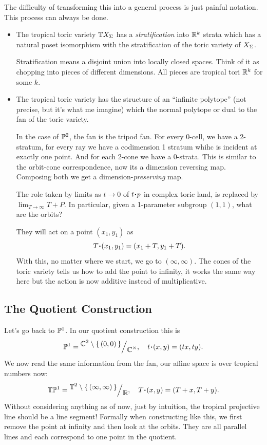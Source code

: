 \documentclass[12pt]{memoir}
\theoremstyle{definition}
\begin{document}
The difficulty of transforming this into a general process is just painful notation. This process can always be done.

\begin{itemize}
    \item The tropical toric variety $\mathbb{T} X_\Sigma$ has a \emph{stratification} into $\mathbb{R}^k$ strata which has a natural poset isomorphism with the stratification of the toric variety of $X_\Sigma$.\par 
     Stratification means a disjoint union into locally closed spaces. Think of it as chopping into pieces of different dimensions. All pieces are tropical tori $\mathbb{R}^k$ for some $k$. 
    \item The tropical toric variety has the structure of an ``infinite polytope'' (not precise, but it's what me imagine) which the normal polytope or dual to the fan of the toric variety.\par 
    In the case of $\mathbb{P}^2$, the fan is the tripod fan. For every 0-cell, we have a 2-stratum, for every ray we have a codimension 1 stratum whihc is incident at exactly one point. And for each 2-cone we have a 0-strata. This is similar to the orbit-cone correspondence, now its a dimension reversing map. Composing both we get a dimension-\emph{preserving} map. \par 
    The role taken by limits as $t\to 0$ of $t\.p$ in complex toric land, is replaced by $\lim_{T\to\infty}T+P$. In particular, given a 1-parameter subgroup $(1,1)$, what are the orbits?\par 
    They will act on a point $(x_1,y_1)$ as 
    $$T\.(x_1,y_1)=(x_1+T,y_1+T).$$
    With this, no matter where we start, we go to $(\infty,\infty)$. The cones of the toric variety tells us how to add the point to infinity, it works the same way here but the action is now additive instead of multiplicative. 
\end{itemize}

\subsection{The Quotient Construction}

Let's go back to $\mathbb{P}^1$. In our quotient construction this is 
$$\bP^1=\quot{\bC^2\less\set{(0,0)}}{\bC^\x},\quad t\.(x,y)=(tx,ty).$$
We now read the same information from the fan, our affine space is over tropical numbers now:
$$\bT\bP^1=\quot{\bT^2\less\set{(\infty,\infty)}}{\bR},\quad T\.(x,y)=(T+x,T+y).$$
Without considering anything as of now, just by intuition, the tropical projective line should be a line segment! Formally when constructing like this, we first remove the point at infinity and then look at the orbits. They are all parallel lines and each correspond to one point in the quotient. 
\end{document}
